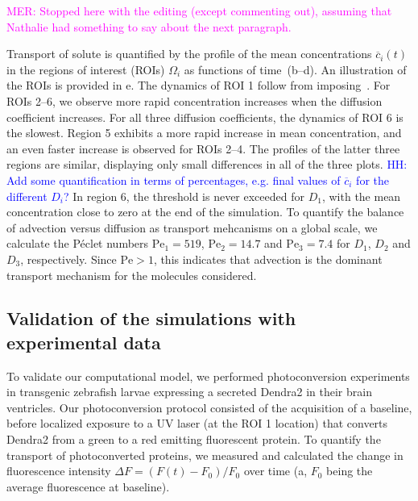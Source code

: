 \documentclass[fleqn]{wlscirep}
\newcommand{\cbar}{\overline{c}}
\newcommand{\lyng}[1]{\textcolor{blue}{#1}}
\newcommand{\mer}[1]{\textcolor{magenta}{#1}}
\begin{document}
\mer{MER: Stopped here with the editing (except commenting out), assuming that Nathalie had something to say about the next paragraph.}

Transport of solute is quantified by the profile of the mean concentrations $\cbar_i(t)$ in the regions of interest (ROIs) $\Omega_i$ as functions of time~(b--d).
An illustration of the ROIs is provided in e. The dynamics of ROI 1 follow from imposing~.
For ROIs 2--6, we observe more rapid concentration increases when the diffusion coefficient increases. 
For all three diffusion coefficients, the dynamics of ROI 6 is the slowest.
Region 5 exhibits a more rapid increase in mean concentration, and an even faster increase is observed for ROIs 2--4.
The profiles of the latter three regions are similar, displaying only small differences in all of the three plots.
\lyng{HH: Add some quantification in terms of percentages, e.g. final values of $\cbar_i$ for the different $D_i$?}
In region 6, the threshold is never exceeded for $D_1$, with the mean concentration close to zero at the end of the simulation. 
To quantify the balance of advection versus diffusion as transport mehcanisms on a global scale,
we calculate the Péclet numbers $\mathrm{Pe}_1=519$, $\mathrm{Pe}_2=14.7$ and $\mathrm{Pe}_3=7.4$ for $D_1$, $D_2$ and $D_3$, respectively.
Since $\mathrm{Pe}>1$, this indicates that advection is the dominant transport mechanism for the molecules considered.
 
\subsection*{Validation of the simulations with experimental data}
To validate our computational model, we performed photoconversion experiments in transgenic zebrafish larvae expressing a secreted Dendra2 in their brain ventricles.
Our photoconversion protocol consisted of the acquisition of a baseline, before localized exposure to a UV laser (at the ROI 1 location)
that converts Dendra2 from a green to a red emitting fluorescent protein. 
To quantify the transport of photoconverted proteins, we measured and calculated the change in fluorescence intensity $\Delta F = (F(t)-F_0)/F_0$
over time (a, $F_0$ being the average fluorescence at baseline). 
\end{document}
